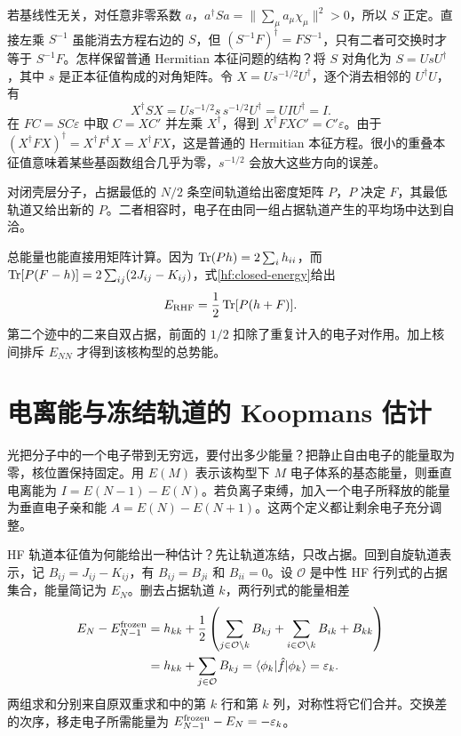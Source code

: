 若基线性无关，对任意非零系数 $a$，$a^\dagger Sa=\|\sum_\mu a_\mu\chi_\mu\|^2>0$，所以 $S$ 正定。直接左乘 $S^{-1}$ 虽能消去方程右边的 $S$，但 $(S^{-1}F)^\dagger=FS^{-1}$，只有二者可交换时才等于 $S^{-1}F$。怎样保留普通 Hermitian 本征问题的结构？将 $S$ 对角化为 $S=UsU^\dagger$，其中 $s$ 是正本征值构成的对角矩阵。令 $X=Us^{-1/2}U^\dagger$，逐个消去相邻的 $U^\dagger U$，有
\begin{equation}
X^\dagger SX=Us^{-1/2}s\,s^{-1/2}U^\dagger=UIU^\dagger=I.
\end{equation}
在 $FC=SC\varepsilon$ 中取 $C=XC'$ 并左乘 $X^\dagger$，得到 $X^\dagger FXC'=C'\varepsilon$。由于 $(X^\dagger FX)^\dagger=X^\dagger F^\dagger X=X^\dagger FX$，这是普通的 Hermitian 本征方程。很小的重叠本征值意味着某些基函数组合几乎为零，$s^{-1/2}$ 会放大这些方向的误差。

对闭壳层分子，占据最低的 $N/2$ 条空间轨道给出密度矩阵 $P$，$P$ 决定 $F$，其最低轨道又给出新的 $P$。二者相容时，电子在由同一组占据轨道产生的平均场中达到自洽。

总能量也能直接用矩阵计算。因为
$\operatorname{Tr}(Ph)=2\sum_i h_{ii}$，而
$\operatorname{Tr}[P(F-h)]=2\sum_{ij}(2J_{ij}-K_{ij})$，式\eqref{hf:closed-energy}给出
\begin{equation}
E_{\rm RHF}=\frac12\operatorname{Tr}[P(h+F)].
\end{equation}
第二个迹中的二来自双占据，前面的 $1/2$ 扣除了重复计入的电子对作用。加上核间排斥 $E_{NN}$ 才得到该核构型的总势能。

\section{电离能与冻结轨道的 Koopmans 估计}\label{hf:koopmans}
光把分子中的一个电子带到无穷远，要付出多少能量？把静止自由电子的能量取为零，核位置保持固定。用 $E(M)$ 表示该构型下 $M$ 电子体系的基态能量，则垂直电离能为 $I=E(N-1)-E(N)$。若负离子束缚，加入一个电子所释放的能量为垂直电子亲和能 $A=E(N)-E(N+1)$。这两个定义都让剩余电子充分调整。

HF 轨道本征值为何能给出一种估计？先让轨道冻结，只改占据。回到自旋轨道表示，记 $B_{ij}=J_{ij}-K_{ij}$，有 $B_{ij}=B_{ji}$ 和 $B_{ii}=0$。设 $\mathcal O$ 是中性 HF 行列式的占据集合，能量简记为 $E_N$。删去占据轨道 $k$，两行列式的能量相差
\begin{align}
E_N-E_{N-1}^{\rm frozen}
&=h_{kk}+\frac12\left(\sum_{j\in\mathcal O\setminus k}B_{kj}
+\sum_{i\in\mathcal O\setminus k}B_{ik}+B_{kk}\right)\notag\\
&=h_{kk}+\sum_{j\in\mathcal O}B_{kj}
=\langle\phi_k|\hat f|\phi_k\rangle=\varepsilon_k.
\end{align}
两组求和分别来自原双重求和中的第 $k$ 行和第 $k$ 列，对称性将它们合并。交换差的次序，移走电子所需能量为 $E_{N-1}^{\rm frozen}-E_N=-\varepsilon_k$。

